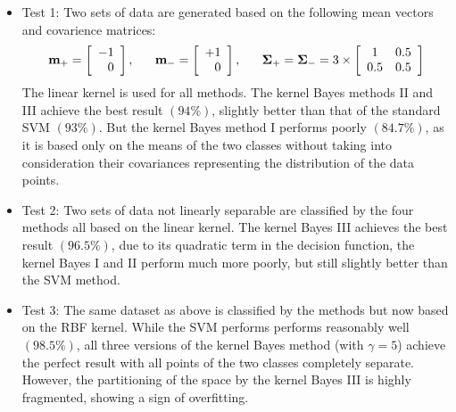 \documentclass{article}
\begin{document}
\begin{itemize}
\item Test 1: Two sets of data are generated based on the following
  mean vectors and covarience matrices:
  \begin{equation}
    {\bf m}_+=\left[\begin{array}{r}-1\\0\end{array}\right],\;\;\;\;\;\;
    {\bf m}_-=\left[\begin{array}{r}+1\\0\end{array}\right],\;\;\;\;\;\;
    {\bf\Sigma}_+={\bf\Sigma}_-
    =3\times \left[\begin{array}{cc}1&0.5\\0.5&0.5\end{array}\right]
  \end{equation}
  The linear kernel is used for all methods. The kernel Bayes methods 
  II and III achieve the best result $(94\%)$, slightly better than that
  of the standard SVM $(93\%)$. But the kernel Bayes method I performs
  poorly $(84.7\%)$, as it is based only on the means of the two classes
  without taking into consideration their covariances representing the
  distribution of the data points.
  

\item Test 2: Two sets of data not linearly separable are classified
  by the four methods all based on the linear kernel. The kernel Bayes
  III achieves the best result $(96.5\%)$, due to its quadratic term 
  in the decision function, the kernel Bayes I and II perform much
  more poorly, but still slightly better than the SVM method.


\item Test 3: The same dataset as above is classified by the methods 
  but now based on the RBF kernel. While the SVM performs performs
  reasonably well $(98.5\%)$, all three versions of the kernel Bayes 
  method (with $\gamma=5$) achieve the perfect result with all points 
  of the two classes completely separate. However, the partitioning
  of the space by the kernel Bayes III is highly fragmented, showing
  a sign of overfitting.
  

\end{itemize}
\end{document}
